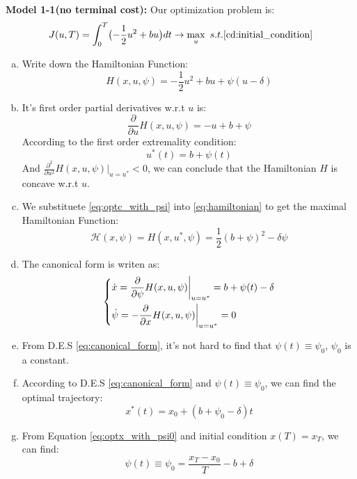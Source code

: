 \documentclass{article}
\begin{document}
{\bf Model 1-1(no terminal cost):} Our optimization problem is:
\begin{equation}
    J(u,T)=\int_{0}^{T}\bigl(-\frac{1}{2}u^2+bu\bigr)dt\rightarrow \max_{u}\ s.t. \eqref{cd:initial_condition}
\end{equation}
\begin{enumerate}[a)]
    \item Write down the Hamiltonian Function:
            \begin{equation}\label{eq:hamiltonian}
                H(x,u,\psi)=-\frac{1}{2}u^2+bu+\psi (u-\delta)
            \end{equation}
    \item It's first order partial derivatives w.r.t $u$ is:
            \begin{equation}
                \frac{\partial }{\partial u}H(x,u,\psi)=-u+b+\psi
            \end{equation}
             According to the first order extremality condition:
             \begin{equation}\label{eq:optc_with_psi}
                u^*(t)=b+\psi(t)
             \end{equation}
             And $\frac{\partial^2 }{\partial u^2}H(x,u,\psi)\big|_{u=u^*}<0$, we can conclude that the Hamiltonian $H$ is concave w.r.t $u$.
    \item We substituete \eqref{eq:optc_with_psi} into \eqref{eq:hamiltonian} to get the maximal Hamiltonian Function:
             \begin{equation}
                \mathcal{H}(x, \psi)=H(x,u^*,\psi)=\frac{1}{2}(b+\psi)^2-\delta\psi
             \end{equation}
    \item The canonical form is writen as:
             \begin{equation}\label{eq:canonical_form}
                 \begin{dcases}
                    \dot{x}= \frac{\partial }{\partial \psi}H(x,u,\psi)\bigg|_{u=u^*}=b+\psi(t)-\delta\\
                    \dot{\psi}=-\frac{\partial }{\partial x}H(x,u,\psi)\bigg|_{u=u^*}=0
                \end{dcases}
             \end{equation}
    \item From D.E.S \eqref{eq:canonical_form}, it's not hard to find that $\psi(t)\equiv \psi_0$, $\psi_0$ is a constant.

    \item According to D.E.S \eqref{eq:canonical_form} and $\psi(t)\equiv \psi_0$, we can find the optimal trajectory:
             \begin{equation}\label{eq:optx_with_psi0}
                 x^*(t)=x_0+(b+\psi_0-\delta)t
             \end{equation}
    \item From Equation \eqref{eq:optx_with_psi0} and initial condition $x(T)=x_T$, we can find:
             \begin{equation}
                \psi(t)\equiv\psi_0=\frac{x_T-x_0}{T}-b+\delta \label{eq:psi}
             \end{equation}


\end{enumerate}
\end{document}
